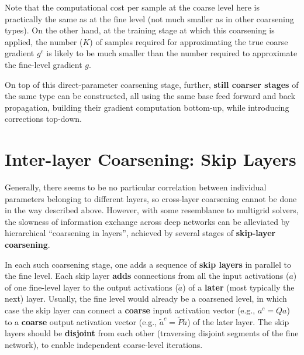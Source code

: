 \documentclass{article} %
\begin{document}
Note that the computational cost per sample at the coarse level here is practically the same as at the fine level (not much smaller as in other coarsening types). On the other hand, at the training stage at which this coarsening is applied, the number ($K$) of samples required for approximating the true coarse gradient $g^c$ is likely to be much smaller than the number required to approximate the fine-level gradient $g$.

On top of this direct-parameter coarsening stage, further, \textbf{still coarser stages} of the same type can be constructed, all using the same base feed forward and back propagation, building their gradient computation bottom-up, while introducing corrections top-down.

\section{Inter-layer Coarsening: Skip Layers}
\label{sec:skip_layers}

Generally, there seems to be no particular correlation between individual parameters belonging to different layers, so cross-layer coarsening cannot be done in the way described above. However, with some resemblance to multigrid solvers, the slowness of information exchange across deep networks can be alleviated by hierarchical ``coarsening in layers'', achieved by several stages of \textbf{skip-layer coarsening}.

In each such coarsening stage, one adds a sequence of \textbf{skip layers} in parallel to the fine level. Each skip layer \textbf{adds} connections from all the input activations ($a$) of one fine-level layer to the output activations ($\tilde{a}$) of a \textbf{later} (most typically the next) layer. Usually, the fine level would already be a coarsened level, in which case the skip layer can connect a \textbf{coarse} input activation vector (e.g., $a^c = Qa$) to a \textbf{coarse} output activation vector (e.g., $\tilde{a}^c = \tilde{P} \tilde{a}$) of the later layer. The skip layers should be \textbf{disjoint} from each other (traversing disjoint segments of the fine network), to enable independent coarse-level iterations.
\end{document}

